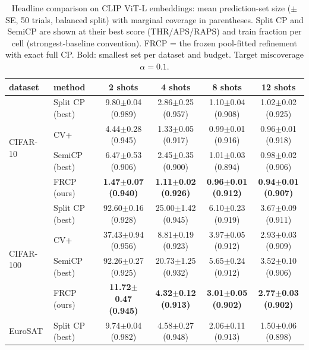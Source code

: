 \begin{table}[t]
\centering
\small
\caption{Headline comparison on CLIP ViT-L embeddings: mean prediction-set size ($\pm$ SE, 50 trials, balanced split) with marginal coverage in parentheses. Split CP and SemiCP are shown at their best score (THR/APS/RAPS) and train fraction per cell (strongest-baseline convention). FRCP = the frozen pool-fitted refinement with exact full CP. Bold: smallest set per dataset and budget. Target miscoverage $\alpha=0.1$.}
\label{tab:headline-clipl}
\begin{tabular}{llcccc}
\toprule
dataset & method & 2 shots & 4 shots & 8 shots & 12 shots\\
\midrule
\multirow{4}{*}{CIFAR-10} & Split CP (best) & 9.80$\pm$0.04 {\scriptsize(0.989)} & 2.86$\pm$0.25 {\scriptsize(0.957)} & 1.10$\pm$0.04 {\scriptsize(0.908)} & 1.02$\pm$0.02 {\scriptsize(0.925)}\\
 & CV+ & 4.44$\pm$0.28 {\scriptsize(0.945)} & 1.33$\pm$0.05 {\scriptsize(0.917)} & 0.99$\pm$0.01 {\scriptsize(0.916)} & 0.96$\pm$0.01 {\scriptsize(0.918)}\\
 & SemiCP (best) & 6.47$\pm$0.53 {\scriptsize(0.906)} & 2.45$\pm$0.35 {\scriptsize(0.900)} & 1.01$\pm$0.03 {\scriptsize(0.894)} & 0.98$\pm$0.02 {\scriptsize(0.906)}\\
 & FRCP (ours) & \textbf{1.47$\pm$0.07 {\scriptsize(0.940)}} & \textbf{1.11$\pm$0.02 {\scriptsize(0.926)}} & \textbf{0.96$\pm$0.01 {\scriptsize(0.912)}} & \textbf{0.94$\pm$0.01 {\scriptsize(0.907)}}\\
\midrule
\multirow{4}{*}{CIFAR-100} & Split CP (best) & 92.60$\pm$0.16 {\scriptsize(0.928)} & 25.00$\pm$1.42 {\scriptsize(0.945)} & 6.10$\pm$0.23 {\scriptsize(0.919)} & 3.67$\pm$0.09 {\scriptsize(0.911)}\\
 & CV+ & 37.43$\pm$0.94 {\scriptsize(0.956)} & 8.81$\pm$0.19 {\scriptsize(0.923)} & 3.97$\pm$0.05 {\scriptsize(0.912)} & 2.93$\pm$0.03 {\scriptsize(0.909)}\\
 & SemiCP (best) & 92.26$\pm$0.27 {\scriptsize(0.925)} & 20.73$\pm$1.25 {\scriptsize(0.932)} & 5.65$\pm$0.24 {\scriptsize(0.912)} & 3.52$\pm$0.10 {\scriptsize(0.906)}\\
 & FRCP (ours) & \textbf{11.72$\pm$0.47 {\scriptsize(0.945)}} & \textbf{4.32$\pm$0.12 {\scriptsize(0.913)}} & \textbf{3.01$\pm$0.05 {\scriptsize(0.902)}} & \textbf{2.77$\pm$0.03 {\scriptsize(0.902)}}\\
\midrule
\multirow{4}{*}{EuroSAT} & Split CP (best) & 9.74$\pm$0.04 {\scriptsize(0.982)} & 4.58$\pm$0.27 {\scriptsize(0.948)} & 2.06$\pm$0.11 {\scriptsize(0.913)} & 1.50$\pm$0.06 {\scriptsize(0.898)}\\

\end{tabular}
\end{table}
